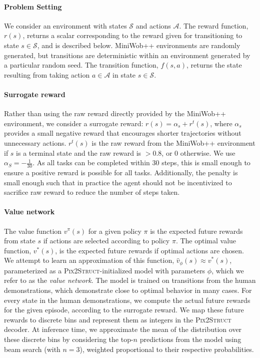 \paragraph{Problem Setting} We consider an environment with states $\mathcal{S}$ and actions $\mathcal{A}$. The reward function, $r(s)$, returns a scalar corresponding to the reward given for transitioning to state $s \in \mathcal{S}$, and is described below.
MiniWob++ environments are randomly generated, but transitions are deterministic within an environment generated by a particular random seed. The transition function, $f(s,a)$, returns the state resulting from taking action $a \in \mathcal{A}$ in state $s \in \mathcal{S}$.

\paragraph{Surrogate reward} Rather than using the raw reward directly provided by the MiniWob++ environment, we consider a surrogate reward: $r(s) = \alpha_{s} + r^t(s)$, where $\alpha_{s}$ provides a small negative reward that encourages shorter trajectories without unnecessary actions. $r^t(s)$ is the raw reward from the MiniWob++ environment if $s$ is a terminal state and the raw reward is $> 0.8$, or $0$ otherwise. We use $\alpha_{S} = -\frac{1}{30}$. As all tasks can be completed within 30 steps, this is small enough to ensure a positive reward is possible for all tasks. Additionally, the penalty is small enough such that in practice the agent should not be incentivized to sacrifice raw reward to reduce the number of steps taken.

\paragraph{Value network} The value function $v^\pi(s)$ for a given policy $\pi$ 
is the expected future rewards from state $s$ if actions are selected according to policy $\pi$. The optimal value function, $v^*(s)$, is the expected future rewards if optimal actions are chosen. We attempt to learn an approximation of this function, $\hat{v}_\phi(s) \approx v^*(s)$, parameterized as a \textsc{Pix2Struct}-initialized model with parameters $\phi$, which we refer to as the \emph{value network}. The model is trained on transitions from the human demonstrations, which demonstrate close to optimal behavior in many cases. For every state in the human demonstrations, we compute the actual future rewards for the given episode, according to the surrogate reward. We map these future rewards to discrete bins and represent them as integers in the \textsc{Pix2Struct} decoder. At inference time, we approximate the mean of the distribution over these discrete bins by considering the top-$n$ predictions from the model using beam search (with $n=3$), weighted proportional to their respective probabilities.

